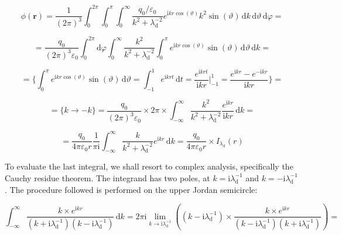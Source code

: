 \begin{equation}
    \phi(\mathbf{r})=\frac{1}{(2\pi)^3}\int_{0}^{2\pi}\int_{0}^{\pi}\int_{0}^{\infty}\frac{q_0/\varepsilon_0}{k^2+\lambda_\mathrm{d}^{-2}}e^{\mathrm{i}kr\cos(\vartheta)}k^2\sin(\vartheta)\,\mathrm{d}k\,\mathrm{d}\vartheta\,\mathrm{d}\varphi=
\end{equation}

\begin{equation}
    =\frac{q_0}{(2\pi)^3\varepsilon_0}\int_{0}^{2\pi}\mathrm{d}\varphi\int_0^{\infty}\frac{k^2}{k^2+\lambda_\mathrm{d}^{-2}}\int_{0}^{\pi}e^{\mathrm{i}kr\cos(\vartheta)}\sin(\vartheta)\,\mathrm{d}\vartheta\,\mathrm{d}k=
\end{equation}

\begin{equation}
    =\Bigg\{\int_0^\pi e^{\mathrm{i}kr\cos(\vartheta)}\sin(\vartheta)\,\mathrm{d}\vartheta=\int_{-1}^1e^{\mathrm{i}krt}\,\mathrm{d}t=\frac{e^{\mathrm{i}krt}}{\mathrm{i}kr}\Biggr|_{-1}^1=\frac{e^{\mathrm{i}kr}-e^{-\mathrm{i}kr}}{\mathrm{i}kr}\Bigg\}=
\end{equation}

\begin{equation}
    =\big\{k\to-k\big\}=\frac{q_0}{(2\pi)^3\varepsilon_0}\times2\pi\times\int_{-\infty}^\infty\frac{k^2}{k^2+\lambda_\mathrm{d}^{-2}}\frac{e^{\mathrm{i}kr}}{\mathrm{i}kr}\,\mathrm{d}k=
\end{equation}

\begin{equation}
    =\frac{q_0}{4\pi\varepsilon_0r}\frac{1}{\pi\mathrm{i}}\int_{-\infty}^\infty\frac{k}{k^2+\lambda_\mathrm{d}^{-2}}e^{\mathrm{i}kr}\,\mathrm{d}k=\frac{q_0}{4\pi\varepsilon_0r}\times I_{\lambda_\mathrm{d}}(r)
\end{equation}

To evaluate the last integral, we shall resort to complex analysis, specifically the Cauchy residue theorem. The integrand has two poles, at $k=\mathrm{i}\lambda_\mathrm{d}^{-1}$ and $k=-\mathrm{i}\lambda_\mathrm{d}^{-1}$. The procedure followed is performed on the upper Jordan semicircle:

\begin{equation}
    \int_{-\infty}^\infty\frac{k\times e^{\mathrm{i}kr}}{\left(k+\mathrm{i}\lambda_\mathrm{d}^{-1}\right)\left(k-\mathrm{i}\lambda_\mathrm{d}^{-1}\right)}\,\mathrm{d}k=2\pi\mathrm{i}\lim_{k\to \mathrm{i}\lambda_\mathrm{d}^{-1}}\left((k-\mathrm{i}\lambda_\mathrm{d}^{-1})\times\frac{k\times e^{\mathrm{i}kr}}{(k-\mathrm{i}\lambda_\mathrm{d}^{-1})(k+\mathrm{i}\lambda_\mathrm{d}^{-1})}\right)=
\end{equation}

